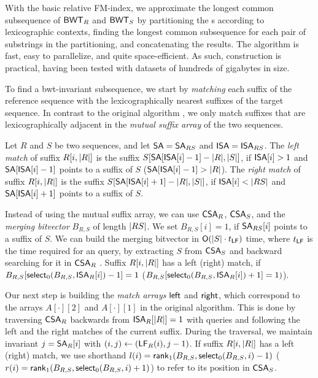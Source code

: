 With the basic relative FM-index, we approximate the longest common
subsequence of $\mathsf{BWT}_{R}$ and $\mathsf{BWT}_{S}$ by partitioning the \BWT{}s according
to lexicographic contexts, finding the longest common subsequence for each
pair of substrings in the partitioning, and concatenating the results. The
algorithm is fast, easy to parallelize, and quite space-efficient. As such,
\RFM{} construction is practical, having been tested with datasets of hundreds
of gigabytes in size.

To find a bwt-invariant subsequence, we start by \emph{matching} each suffix
of the reference sequence with the lexicographically nearest suffixes of the
target sequence. In contrast to the original algorithm \cite{Belazzougui2014}, we
only match suffixes that are lexicographically adjacent in the \emph{mutual
suffix array} of the two sequences.

\begin{definition}
Let $R$ and $S$ be two sequences, and let $\mathsf{SA} = \mathsf{SA}_{RS}$ and $\mathsf{ISA} =
\mathsf{ISA}_{RS}$. The \emph{left match} of suffix $R[i,\lvert R \rvert]$ is the suffix
$S[\mathsf{SA}[\mathsf{ISA}[i]-1] - \lvert R \rvert, \lvert S \rvert]$, if $\mathsf{ISA}[i] > 1$ and
$\mathsf{SA}[\mathsf{ISA}[i]-1]$ points to a suffix of $S$ ($\mathsf{SA}[\mathsf{ISA}[i]-1] > \lvert R \rvert$).
The \emph{right match} of suffix $R[i,\lvert R \rvert]$ is the suffix
$S[\mathsf{SA}[\mathsf{ISA}[i]+1] - \lvert R \rvert, \lvert S \rvert]$, if $\mathsf{ISA}[i] < \lvert RS \rvert$ and
$\mathsf{SA}[\mathsf{ISA}[i]+1]$ points to a suffix of $S$.
\end{definition}

Instead of using the mutual suffix array, we can use $\mathsf{CSA}_{R}$, $\mathsf{CSA}_{S}$,
and the \emph{merging bitvector} $B_{R,S}$ of length $\lvert RS \rvert$. We set
$B_{R,S}[i] = 1$, if $\mathsf{SA}_{RS}[i]$ points to a suffix of $S$. We can build the
merging bitvector in $\mathsf{O}(\lvert S \rvert \cdot t_{\mathsf{LF}})$ time, where $t_{\mathsf{LF}}$ is
the time required for an \LF{} query, by extracting $S$ from $\mathsf{CSA}_{S}$ and
backward searching for it in $\mathsf{CSA}_{R}$ \cite{Siren2009}. Suffix
$R[i,\lvert R \rvert]$ has a left (right) match, if $B_{R,S}[\mathsf{select}_{0}(B_{R,S},
\mathsf{ISA}_{R}[i])-1] = 1$ ($B_{R,S}[\mathsf{select}_{0}(B_{R,S}, \mathsf{ISA}_{R}[i])+1] = 1)$).

Our next step is building the \emph{match arrays} $\mathsf{left}$ and $\mathsf{right}$,
which correspond to the arrays $A[\cdot][2]$ and $A[\cdot][1]$ in the original
algorithm. This is done by traversing $\mathsf{CSA}_{R}$ backwards from
$\mathsf{ISA}_{R}[\lvert R \rvert] = 1$ with \LF{} queries and following the left and the
right matches of the current suffix. During the traversal, we maintain
invariant $j = \mathsf{SA}_{R}[i]$ with $(i,j) \leftarrow (\mathsf{LF}_{R}(i), j-1)$. If
suffix $R[i,\lvert R \rvert]$ has a left (right) match, we use shorthand $l(i) =
\mathsf{rank}_{1}(B_{R,S}, \mathsf{select}_{0}(B_{R,S}, i)-1)$ ($r(i) = \mathsf{rank}_{1}(B_{R,S},
\mathsf{select}_{0}(B_{R,S}, i)+1)$) to refer to its position in $\mathsf{CSA}_{S}$.

